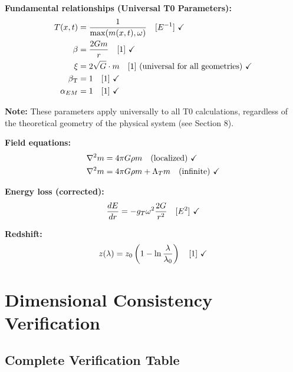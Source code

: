 \documentclass[12pt,a4paper]{article}
\newcommand{\betaT}{\beta_{\text{T}}}
\begin{document}
	\begin{tcolorbox}[colback=green!5!white,colframe=green!75!black,title=T0 Model Parameters (All Dimensionally Consistent)]
		
		\textbf{Fundamental relationships (Universal T0 Parameters):}
		\begin{align}
			T(x,t) &= \frac{1}{\max(m(x,t), \omega)} \quad [E^{-1}] \text{ \checkmark} \\
			\beta &= \frac{2Gm}{r} \quad [1] \text{ \checkmark} \\
			\xi &= 2\sqrt{G} \cdot m \quad [1] \text{ (universal for all geometries)} \text{ \checkmark} \\
			\betaT &= 1 \quad [1] \text{ \checkmark} \\
			\alpha_{EM} &= 1 \quad [1] \text{ \checkmark}
		\end{align}
		
		\textbf{Note:} These parameters apply universally to all T0 calculations, regardless of the theoretical geometry of the physical system (see Section 8).
		
		
		\textbf{Field equations:}
		\begin{align}
			\nabla^2 m &= 4\pi G \rho m \quad \text{(localized)} \text{ \checkmark} \\
			\nabla^2 m &= 4\pi G \rho m + \Lambda_T m \quad \text{(infinite)} \text{ \checkmark}
		\end{align}
		
		\textbf{Energy loss (corrected):}
		\begin{equation}
			\frac{dE}{dr} = -g_T \omega^2 \frac{2G}{r^2} \quad [E^2] \text{ \checkmark}
		\end{equation}
		
		\textbf{Redshift:}
		\begin{equation}
			z(\lambda) = z_0\left(1 - \ln\frac{\lambda}{\lambda_0}\right) \quad [1] \text{ \checkmark}
		\end{equation}
		
	\end{tcolorbox}
	
	\section{Dimensional Consistency Verification}
	\label{sec:dimensional_verification}
	
	\subsection{Complete Verification Table}
	
\end{document}
